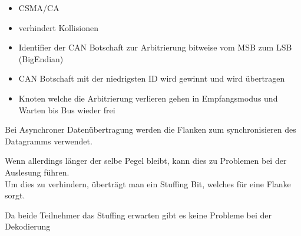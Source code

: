 \documentclass[letterpaper,10pt,english]{jupyterBook}
\begin{document}
\begin{DUlineblock}{0em}
\item[] 
\end{DUlineblock}
\begin{itemize}
\item {} 
\sphinxAtStartPar
CSMA/CA

\item {} 
\sphinxAtStartPar
verhindert Kollisionen

\item {} 
\sphinxAtStartPar
Identifier der CAN Botschaft zur Arbitrierung bitweise vom MSB zum LSB (Big\sphinxhyphen{}Endian)

\item {} 
\sphinxAtStartPar
CAN Botschaft mit der niedrigsten ID wird gewinnt und wird übertragen

\item {} 
\sphinxAtStartPar
Knoten welche die Arbitrierung verlieren gehen in Empfangsmodus und Warten bis Bus wieder frei

\end{itemize}

\sphinxAtStartPar
{}

\begin{DUlineblock}{0em}
\item[] 
\end{DUlineblock}

\begin{DUlineblock}{0em}
\item[] 
\end{DUlineblock}

\sphinxAtStartPar
Bei Asynchroner Datenübertragung werden die Flanken zum synchronisieren des Datagramms verwendet.

\sphinxAtStartPar
Wenn allerdings länger der selbe Pegel bleibt,
kann dies zu Problemen bei der Auslesung führen.\\
Um dies zu verhindern,
überträgt man ein Stuffing Bit,
welches für eine Flanke sorgt.

\sphinxAtStartPar
Da beide Teilnehmer das Stuffing erwarten gibt es keine Probleme bei der Dekodierung

\begin{DUlineblock}{0em}
\item[] 
\end{DUlineblock}
\end{document}
